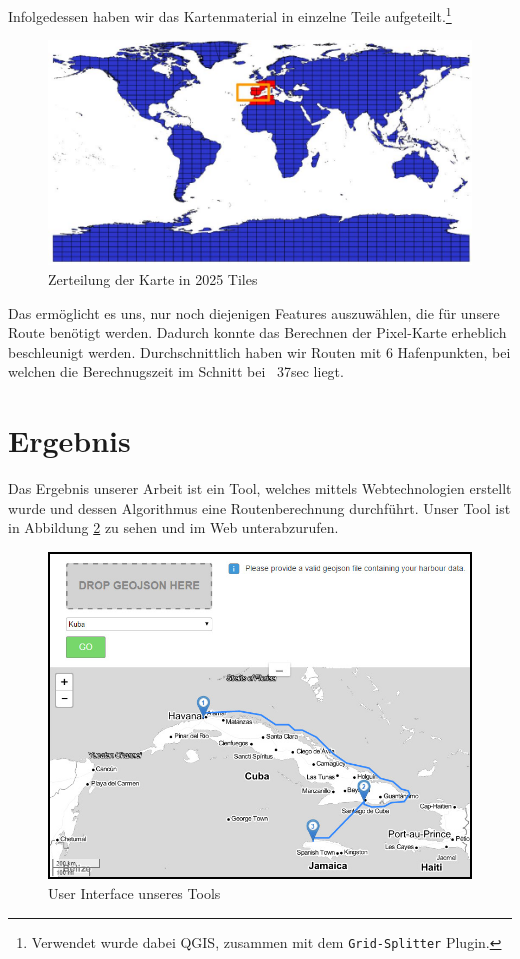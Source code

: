 \documentclass[letterpaper]{article}
\begin{document}
	Infolgedessen haben wir das Kartenmaterial in einzelne Teile aufgeteilt.\footnote{Verwendet wurde dabei QGIS\cite{qgis}, zusammen mit dem \texttt{Grid-Splitter} Plugin.}

	\begin{figure}[!htb]
		\centering
		\includegraphics[width=\linewidth]{grid_splitter}
		\caption{Zerteilung der Karte in 2025 Tiles}
		\label{fig:grid_splitter}
	\end{figure}

	Das ermöglicht es uns, nur noch diejenigen Features auszuwählen, die für unsere Route benötigt werden. Dadurch konnte das Berechnen der Pixel-Karte erheblich beschleunigt werden. Durchschnittlich haben wir Routen mit 6 Hafenpunkten, bei welchen die Berechnugszeit im Schnitt bei ~37sec liegt.

\section{Ergebnis}
	Das Ergebnis unserer Arbeit ist ein Tool, welches mittels Webtechnologien erstellt wurde und dessen Algorithmus eine Routenberechnung durchführt.
	Unser Tool ist in Abbildung \ref{fig:tool} zu sehen und im Web unter\footnotemark abzurufen.


	\begin{figure}[htbp]
		\centering
		\includegraphics[width=\linewidth]{tool}
		\caption{User Interface unseres Tools}
		\label{fig:tool}
	\end{figure}
\end{document}
